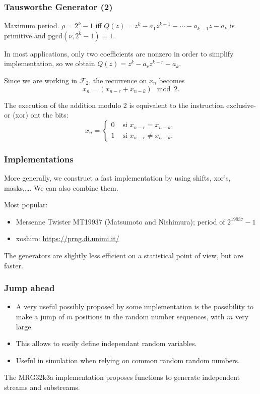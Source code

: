 \documentclass{beamer}
\begin{document}
	\begin{frame}
		\frametitle{Tausworthe Generator (2)}
		
		{\blue Maximum period.} $\rho = 2^k-1$ iff ${Q(z)} = z^k - a_1 z^{k-1}
		- \cdots - a_{k-1} z - a_k$ is primitive and $\mbox{pgcd}(\nu, 2^k-1)
		= 1$.
		
		\mbox{}
		
		In most applications, only two coefficients are nonzero in order to
		simplify implementation, so we obtain ${Q(z)} = z^k - a_r z^{k-r} - a_k$.
		
		\mbox{}
		
		Since we are working in $\mathcal{F}_2$, the recurrence on $x_n$ becomes
		\[
		x_n = (x_{n-r}+x_{n-k}) \mod 2.
		\]
		
		\mbox{}
		
		The execution of the addition modulo 2 is equivalent to the
		instruction exclusive-or (xor) ont the bits:
		\[
		x_n =
		\begin{cases}
			0 & \mbox{ si } x_{n-r} = x_{n-k},\\
			1 & \mbox{ si } x_{n-r} \ne x_{n-k}.
		\end{cases}
		\]
		
	\end{frame}
	
	\begin{frame}
		\frametitle{Implementations}
		
		More generally, we construct a fast implementation by using shifts,
		xor's, masks,\ldots. We can also combine them.
		
		\mbox{}
		
Most popular:
\begin{itemize}
	\item 
	Mersenne Twister MT19937 (Matsumoto and Nishimura); period of $2^{19937}-1$
	\item
	xoshiro: \url{https://prng.di.unimi.it/}
\end{itemize}

The generators are slightly less efficient on a statistical point of view, but are faster.
		
	\end{frame}

\begin{frame}
\frametitle{Jump ahead}

\begin{itemize}
	\item 
A very useful possibly proposed by some implementation is the possibility to make a jump of $m$ positions in the random number sequences, with $m$ very large.
\item
This allows to easily define independant random variables.
\item
Useful in simulation when relying on common random random numbers.
\end{itemize}

The MRG32k3a implementation proposes functions to generate independent streams and substreams.

	
\end{frame}
\end{document}

